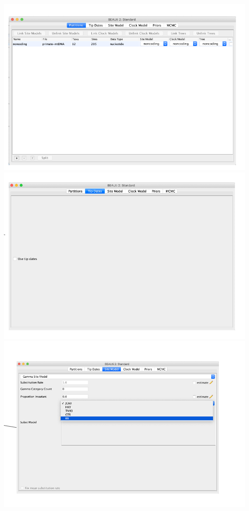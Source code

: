 \documentclass[
  letterpaper,
]{book}
\begin{document}
\includegraphics{assets/images/chapters/phylogenomics/27.png}
\includegraphics{assets/images/chapters/phylogenomics/28.png}
\includegraphics{assets/images/chapters/phylogenomics/29.png}
\end{document}
